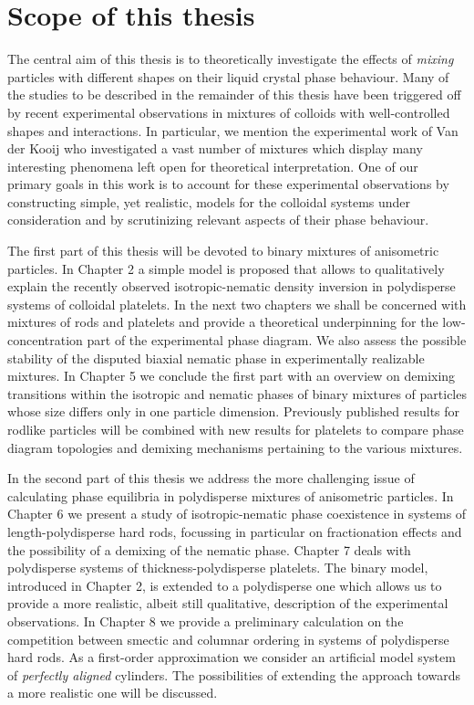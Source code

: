 {\section{Scope of this thesis}
The central aim of this thesis is to theoretically investigate
the effects of  {\em mixing}  particles with different shapes
on their liquid crystal phase behaviour.
Many of the studies to be described in the remainder of this thesis have been triggered off
by recent experimental observations in mixtures of colloids with well-controlled shapes
and interactions.
In particular, we mention the experimental work of Van der Kooij \cite{felixthesis} who investigated a vast number
of mixtures which display many interesting phenomena left open for theoretical interpretation.
One of our primary goals in this work is to account for these
experimental observations by constructing simple, yet realistic,  models
for the colloidal systems under consideration
and by scrutinizing relevant aspects of their phase behaviour.

The first part of this thesis will be devoted to binary mixtures of anisometric particles.
In Chapter 2 a simple model is proposed that allows to qualitatively explain
the recently observed isotropic-nematic density inversion in polydisperse systems of colloidal platelets.
In the next two chapters  we shall be concerned with mixtures of rods and platelets and
provide a theoretical underpinning for the low-concentration part of the experimental
phase diagram. We also assess the possible stability of the disputed biaxial nematic phase
in experimentally realizable mixtures.
In Chapter 5 we conclude the first part with  an overview on demixing transitions
within the isotropic and nematic phases of binary mixtures of particles
whose size differs only in one particle dimension. Previously published results for rodlike particles
will be combined with new results for platelets to compare phase diagram topologies and
demixing mechanisms pertaining to the various mixtures.

In the second part of this thesis we address the more challenging issue of calculating
phase equilibria in polydisperse mixtures of anisometric particles.
In Chapter 6 we present a study of isotropic-nematic phase coexistence in systems of
length-polydisperse hard rods, focussing in particular on fractionation effects and
the possibility of a demixing of the nematic phase.
Chapter 7 deals with polydisperse systems of thickness-polydisperse
platelets. The binary model, introduced in Chapter 2, is extended to a polydisperse
one which allows us to provide a more realistic, albeit still qualitative, description of the experimental observations.
In Chapter 8 we provide a preliminary
calculation on the competition
between smectic and columnar ordering in systems of polydisperse hard rods.  As a first-order
approximation we consider an artificial model system of {\em perfectly aligned} cylinders. The  possibilities of extending the approach towards a more realistic one will be discussed.


}
